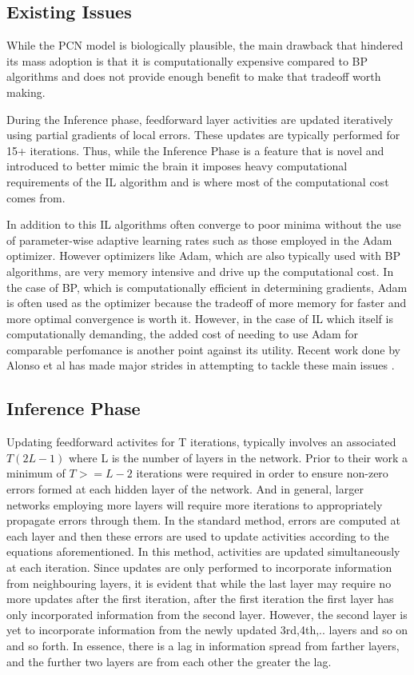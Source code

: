 \documentclass{article}
\theoremstyle{plain}
\theoremstyle{definition}
\theoremstyle{remark}
\begin{document}
\subsection*{Existing Issues}

While the PCN model is biologically plausible, the main drawback that
hindered its mass adoption is that it is computationally expensive 
compared to BP algorithms and does not provide enough benefit to make 
that tradeoff worth making.

During the Inference phase, feedforward layer activities are updated iteratively
using partial gradients of local errors. These updates are typically performed 
for 15+ iterations. Thus, while the Inference Phase is a feature that is novel 
and introduced to better mimic the brain it imposes heavy computational requirements
of the IL algorithm and is where most of the computational cost comes from.

In addition to this IL algorithms often converge to poor minima without the use 
of parameter-wise adaptive learning rates such as those employed in the Adam optimizer.
However optimizers like Adam, which are also typically used with BP algorithms, are very 
memory intensive and drive up the computational cost. In the case of BP, which is computationally
efficient in determining gradients, Adam is often used as the optimizer because the tradeoff of more memory 
for faster and more optimal convergence is worth it. However, in the case of IL 
which itself is computationally demanding, the added cost of needing to use Adam for comparable 
perfomance is another point against its utility. Recent work done by Alonso et al has made major strides in attempting to tackle these 
main issues \cite{alonso2024understanding}. 

\subsection*{Inference Phase}

Updating feedforward activites for T iterations,
typically involves an associated \(T(2L-1)\) where L is the number of layers in the network. 
Prior to their work a minimum of \(T >= L - 2\) iterations were required in order to ensure
non-zero errors formed at each hidden layer of the network. And in general, larger networks 
employing more layers will require more iterations to appropriately propagate errors through them.
In the standard method, errors are computed at each layer and then these errors are used to update 
activities according to the equations aforementioned. In this method, activities are updated simultaneously
at each iteration. Since updates are only performed to incorporate information from neighbouring layers,
it is evident that while the last layer may require no more updates after the first iteration, after the first 
iteration the first layer has only incorporated information from the second layer. However, the second layer
is yet to incorporate information from the newly updated 3rd,4th,.. layers and so on and so forth.
In essence, there is a lag in information spread from farther layers, and the further two layers are 
from each other the greater the lag.
\end{document}
